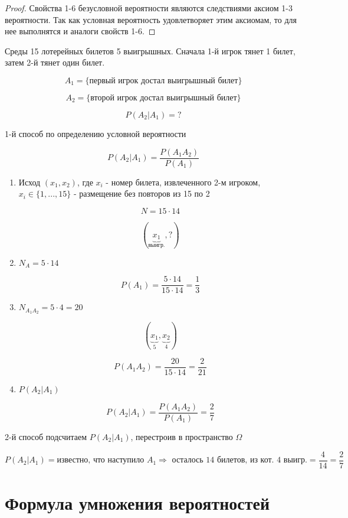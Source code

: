 \documentclass[a4paper, 14pt]{report}
\begin{document}
\begin{proof}
    Свойства 1-6 безусловной вероятности являются следствиями аксиом 1-3 вероятности. Так как условная вероятность удовлетворяет этим аксиомам, то для нее выполнятся и аналоги свойств 1-6.
\end{proof}

Среды 15 лотерейных билетов 5 выигрышных. Сначала 1-й игрок тянет 1 билет, затем 2-й тянет один билет.

$$
A_1 = \{ \text{первый игрок достал выигрышный билет} \}
$$

$$
A_2 = \{ \text{второй игрок достал выигрышный билет} \}
$$

$$
P(A_2|A_1) = ?
$$

1-й способ по определению условной вероятности

$$
P(A_2|A_1) = \frac{P(A_1A_2)}{P(A_1)}
$$

\begin{enumerate}
    \item Исход $(x_1,x_2)$, где $x_i$ - номер билета, извлеченного 2-м игроком, $x_i \in \{ 1, ... , 15 \}$ - размещение без повторов из 15 по 2

        $$
        N = 15 \cdot 14
        $$

        $$
        (\underbrace{x_1}_{\text{выигр.}}, ?)
        $$

    \item $N_A = 5 \cdot 14$

        $$
        P(A_1) = \frac{5 \cdot 14}{15 \cdot 14} = \frac{1}{3}
        $$

    \item $N_{A_1A_2} = 5 \cdot 4 = 20$

        $$
        (\underbrace{x_1}_5, \underbrace{x_2}_4)
        $$

        $$
        P(A_1A_2) = \frac{20}{15 \cdot 14} = \frac{2}{21}
        $$

    \item $P(A_2|A_1)$

        $$
        P(A_2 | A_1) = \frac{P(A_1A_2)}{P(A_1)} = \frac{2}{7}
        $$
\end{enumerate}

2-й способ подсчитаем $P(A_2|A_1)$, перестроив в пространство $\Omega$

$$
P(A_2|A_1) = \text{известно, что наступило } A_1 \Rightarrow \text{ осталось 14 билетов, из кот. 4 выигр.} = \frac{4}{14} = \frac{2}{7}
$$

\section{Формула умножения вероятностей}
\end{document}
